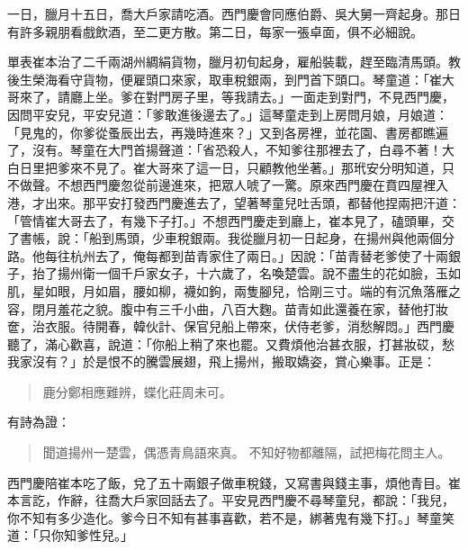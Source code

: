 一日，臘月十五日，喬大戶家請吃酒。西門慶會同應伯爵、吳大舅一齊起身。那日有許多親朋看戲飲酒，至二更方散。第二日，每家一張卓面，俱不必細說。

單表崔本治了二千兩湖州綢絹貨物，臘月初旬起身，雇船裝載，趕至臨清馬頭。教後生榮海看守貨物，便雇頭口來家，取車稅銀兩，到門首下頭口。琴童道：「崔大哥來了，請廳上坐。爹在對門房子里，等我請去。」一面走到對門，不見西門慶，因問平安兒，平安兒道：「爹敢進後邊去了。」這琴童走到上房問月娘，月娘道：「見鬼的，你爹從蚤辰出去，再幾時進來？」又到各房裡，並花園、書房都瞧遍了，沒有。琴童在大門首揚聲道：「省恐殺人，不知爹往那裡去了，白尋不著！大白日里把爹來不見了。崔大哥來了這一日，只顧教他坐著。」那玳安分明知道，只不做聲。不想西門慶忽從前邊進來，把眾人唬了一驚。原來西門慶在賁四屋裡入港，才出來。那平安打發西門慶進去了，望著琴童兒吐舌頭，都替他捏兩把汗道：「管情崔大哥去了，有幾下子打。」不想西門慶走到廳上，崔本見了，磕頭畢，交了書帳，說：「船到馬頭，少車稅銀兩。我從臘月初一日起身，在揚州與他兩個分路。他每往杭州去了，俺每都到苗青家住了兩日。」因說：「苗青替老爹使了十兩銀子，抬了揚州衛一個千戶家女子，十六歲了，名喚楚雲。說不盡生的花如臉，玉如肌，星如眼，月如眉，腰如柳，襪如鉤，兩隻腳兒，恰剛三寸。端的有沉魚落雁之容，閉月羞花之貌。腹中有三千小曲，八百大麴。苗青如此還養在家，替他打妝奩，治衣服。待開春，韓伙計、保官兒船上帶來，伏侍老爹，消愁解悶。」西門慶聽了，滿心歡喜，說道：「你船上稍了來也罷。又費煩他治甚衣服，打甚妝砹，愁我家沒有？」於是恨不的騰雲展翅，飛上揚州，搬取嬌姿，賞心樂事。正是：
\begin{quote}
鹿分鄭相應難辨，蝶化莊周未可。
\end{quote}
有詩為證：
\begin{quote}
聞道揚州一楚雲，偶憑青鳥語來真。
不知好物都離隔，試把梅花問主人。
\end{quote}

西門慶陪崔本吃了飯，兌了五十兩銀子做車稅錢，又寫書與錢主事，煩他青目。崔本言訖，作辭，往喬大戶家回話去了。平安見西門慶不尋琴童兒，都說：「我兒，你不知有多少造化。爹今日不知有甚事喜歡，若不是，綁著鬼有幾下打。」琴童笑道：「只你知爹性兒。」

